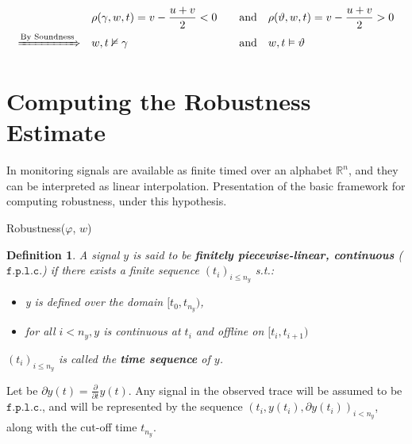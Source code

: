 \documentclass{suftesi}
\newtheorem*{definition}{Definition}
\renewcommand{\b}{\textbf}
\begin{document}
\begin{align*}
                                    &\quad\rho(\gamma, w, t) = v - \frac{u + v}{2} < 0      &\quad \text{and} \quad     & \rho(\vartheta, w, t) = v - \frac{u + v}{2} > 0 \\
\xRightarrow{\text{By Soundness}}   &\quad w, t \nvDash \gamma                              &\quad \text{and} \quad     & w, t \vDash \vartheta
\end{align*}

\section{Computing the Robustness Estimate}

In monitoring signals are available as finite timed over an alphabet $\mathbb{R}^n$, and they can be interpreted as linear interpolation. Presentation of the basic framework for computing robustness, under this hypothesis. 

\begin{algorithm}[H]
    \caption{Robustness($\varphi$, $w$)}
\end{algorithm}

\begin{definition}
    A signal $y$ is said to be \b{finitely piecewise-linear, continuous} ($\mathtt{f.p.l.c.}$) if there exists a finite sequence $(t_i)_{i\leq n_y}$ s.t.:
    \begin{itemize}[leftmargin=0.5cm]
        \item y is defined over the domain $[t_0,t_{n_y})$,
        \item for all $i<n_y,y$ is continuous at $t_i$ and offline on $[t_i,t_{i+1})$
    \end{itemize}
    $(t_i)_{i\leq n_y}$ is called the \b{time sequence} of $y$.
\end{definition}

Let be $\partial y(t)=\frac{\partial}{\partial t}y(t)$. Any signal in the observed trace will be assumed to be $\mathtt{f.p.l.c.}$, and will be represented by the sequence $(t_i,y(t_i),\partial y(t_i))_{i<n_y}$, along with the cut-off time $t_{n_y}$. 
\end{document}
